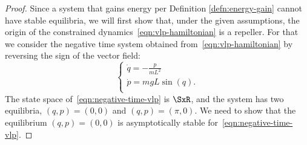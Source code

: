 \begin{proof}
Since a system that gains energy per Definition \ref{defn:energy-gain}
cannot have stable equilibria,
we will first show that, under the given assumptions, the origin of the
constrained dynamics~\eqref{eqn:vlp-hamiltonian} is a repeller. 
For that we consider the negative time system obtained
from~\eqref{eqn:vlp-hamiltonian} by reversing the sign of the vector field:
\begin{equation}\label{eqn:negative-time-vlp}
   \begin{cases}
      \dot{q} = -\frac{p}{m L^2} \\
      \dot{p} = mgL\sin(q)
      . \\ 
   \end{cases}
\end{equation}
The state space of~\eqref{eqn:negative-time-vlp} is 
\(\SxR\), and the system has two equilibria,
\((q,p) = (0,0)\) and \((q,p) = (\pi,0)\). 
We need to show that the equilibrium \((q,p) = (0,0)\) is
asymptotically stable for~\eqref{eqn:negative-time-vlp}. 


\end{proof}
